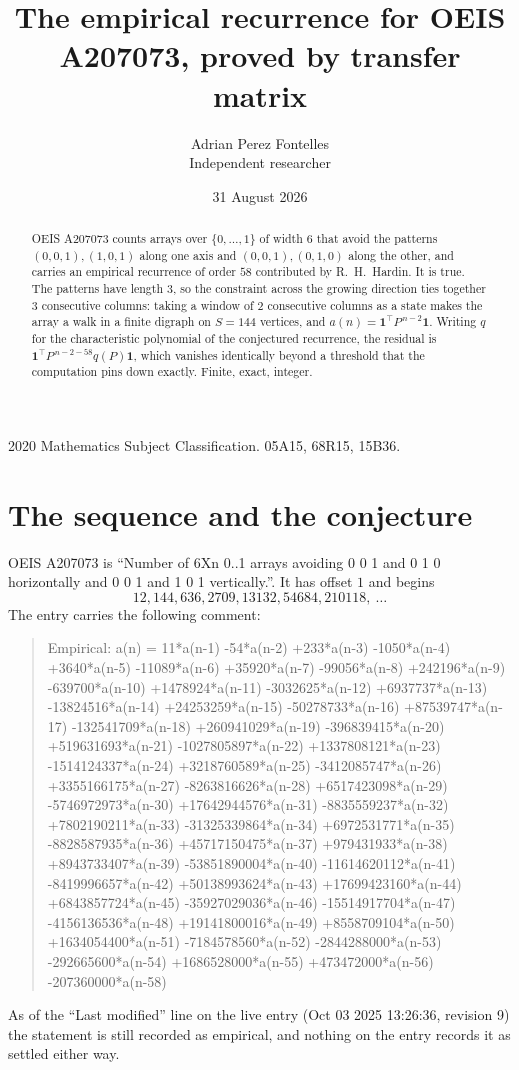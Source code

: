 \documentclass[11pt,a4paper]{article}
\title{The empirical recurrence for OEIS A207073, proved by transfer matrix}
\author{Adrian Perez Fontelles\\ \small Independent researcher}
\date{31 August 2026}
\theoremstyle{plain}
\theoremstyle{definition}
\begin{document}
\maketitle

\begin{abstract}
OEIS A207073 counts arrays over $\{0,\dots,1\}$ of width $6$ that avoid the patterns
$(0,0,1), (1,0,1)$ along one axis and $(0,0,1), (0,1,0)$ along the other, and carries an empirical recurrence of
order $58$ contributed by R.~H.~Hardin. It is true. The patterns have length $3$, so
the constraint across the growing direction ties together $3$ consecutive columns: taking a
window of $2$ consecutive columns as a state makes the array a walk in a finite digraph
on $S=144$ vertices, and $a(n)=\mathbf{1}^{\!\top}P^{\,n-2}\mathbf{1}$. Writing $q$
for the characteristic polynomial of the conjectured recurrence, the residual is
$\mathbf{1}^{\!\top}P^{\,n-2-58}q(P)\mathbf{1}$, which vanishes identically
beyond a threshold that the computation pins down exactly. Finite, exact, integer.
\end{abstract}

\noindent\small 2020 Mathematics Subject Classification. 05A15, 68R15, 15B36.\normalsize

\section{The sequence and the conjecture}

OEIS A207073 is ``Number of 6Xn 0..1 arrays avoiding 0 0 1 and 0 1 0 horizontally and 0 0 1 and 1 0 1 vertically.''. It has offset
$1$ and begins
\[
12, 144, 636, 2709, 13132, 54684, 210118,\ \dots
\]
The entry carries the following comment:
\begin{quote}\small
Empirical: a(n) = 11*a(n-1) -54*a(n-2) +233*a(n-3) -1050*a(n-4) +3640*a(n-5) -11089*a(n-6) +35920*a(n-7) -99056*a(n-8) +242196*a(n-9) -639700*a(n-10) +1478924*a(n-11) -3032625*a(n-12) +6937737*a(n-13) -13824516*a(n-14) +24253259*a(n-15) -50278733*a(n-16) +87539747*a(n-17) -132541709*a(n-18) +260941029*a(n-19) -396839415*a(n-20) +519631693*a(n-21) -1027805897*a(n-22) +1337808121*a(n-23) -1514124337*a(n-24) +3218760589*a(n-25) -3412085747*a(n-26) +3355166175*a(n-27) -8263816626*a(n-28) +6517423098*a(n-29) -5746972973*a(n-30) +17642944576*a(n-31) -8835559237*a(n-32) +7802190211*a(n-33) -31325339864*a(n-34) +6972531771*a(n-35) -8828587935*a(n-36) +45717150475*a(n-37) +979431933*a(n-38) +8943733407*a(n-39) -53851890004*a(n-40) -11614620112*a(n-41) -8419996657*a(n-42) +50138993624*a(n-43) +17699423160*a(n-44) +6843857724*a(n-45) -35927029036*a(n-46) -15514917704*a(n-47) -4156136536*a(n-48) +19141800016*a(n-49) +8558709104*a(n-50) +1634054400*a(n-51) -7184578560*a(n-52) -2844288000*a(n-53) -292665600*a(n-54) +1686528000*a(n-55) +473472000*a(n-56) -207360000*a(n-58)
\end{quote}
As of the ``Last modified'' line on the live entry (Oct 03 2025 13:26:36, revision
9) the statement is still recorded as empirical, and nothing on the entry
records it as settled either way.
\end{document}
